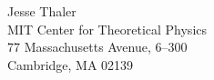 Jesse Thaler\\
MIT Center for Theoretical Physics\\
77 Massachusetts Avenue, 6--300\\
Cambridge, MA 02139
